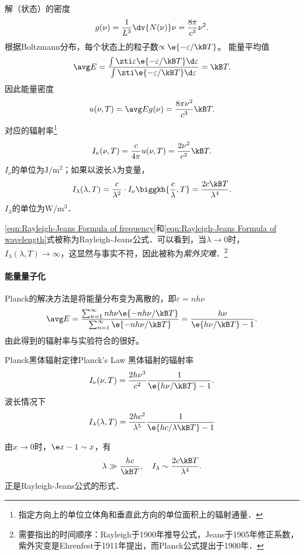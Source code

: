 解（状态）的密度
\[
	g(\nu)=\frac1{L^3}\dv{N(\nu)}\nu=\frac{8\pi}{c^3}\nu^2.
\]
根据Boltzmann分布，每个状态上的粒子数$\propto\e{-\varepsilon/\kB T}$。
能量平均值
\begin{align}
	\avg E=\frac{\textstyle\int\zti\varepsilon\e{-\varepsilon/\kB T}\d\varepsilon}{\textstyle\int\zti\e{-\varepsilon/\kB T}\d\varepsilon}=\kB T.
\end{align}
因此能量密度
\[
u(\nu,T)=\avg Eg(\nu)=\frac{8\pi\nu^2}{c^3}\kB T.
\]
对应的辐射率\footnote{指定方向上的单位立体角和垂直此方向的单位面积上的辐射通量．}
\begin{align}
	\label{eqn:Rayleigh-Jeans Formula of frequency}
	I_\nu(\nu,T)=\frac c{4\pi}u(\nu,T)=\frac{2\nu^2}{c^2}\kB T.
\end{align}
$I_\nu$的单位为$\si{\J\per\m\squared}$；如果以波长$\lambda$为变量，%
\begin{align}
	\label{eqn:Rayleigh-Jeans Formula of wavelength}
	I_\lambda(\lambda,T)=\frac{c}{\lambda^2}\cdot I_\nu\biggkh{\frac c\lambda,T}=\frac{2c\kB T}{\lambda^4}.
\end{align}
$I_\lambda$的单位为$\si{\W\per\m\cubed}$．

\eqref{eqn:Rayleigh-Jeans Formula of frequency}和\eqref{eqn:Rayleigh-Jeans Formula of wavelength}式被称为Rayleigh-Jeans公式．可以看到，当$\lambda\to0$时，$I_\lambda(\lambda,T)\to\infty$，这显然与事实不符，因此被称为\textit{紫外灾难}．\footnote{需要指出的时间顺序：Rayleigh于1900年推导公式，Jeans于1905年修正系数，紫外灾变是Ehrenfest于1911年提出，而Planck公式提出于1900年．}
\paragraph{能量量子化}
Planck的解决方法是将能量分布变为离散的，即$\varepsilon=nh\nu$
\begin{align}
	\avg E=\frac{\textstyle\sum_{n=1}^\infty nh\nu\e{-nh\nu/\kB T}}{\textstyle\sum_{n=1}^\infty\e{-nh\nu/\kB T}}=\frac{h\nu}{\e{h\nu/\kB T}-1}.
\end{align}
由此得到的辐射率与实验符合的很好。
\begin{theorem}{Planck黑体辐射定律}{Planck's Law}
	黑体辐射的辐射率
	\begin{align}
		I_\nu(\nu,T)=\frac{2h\nu^3}{c^2}\frac{1}{\e{h\nu/\kB T}-1}.
	\end{align}
	波长情况下
	\begin{align}
		I_\lambda(\lambda,T)=\frac{2hc^2}{\lambda^5}\frac{1}{\e{hc/\lambda\kB T}-1}
	\end{align}
\end{theorem}
由$x\to0$时，$\e x-1\sim x$，有
\[
	\lambda\gg\frac{hc}{\kB T},\quad I_\lambda\sim\frac{2c\kB T}{\lambda^4}.
\]
正是Rayleigh-Jeans公式的形式．

